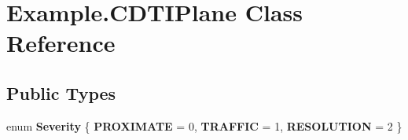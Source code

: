 \hypertarget{class_example_1_1_c_d_t_i_plane}{}\section{Example.\+C\+D\+T\+I\+Plane Class Reference}
\label{class_example_1_1_c_d_t_i_plane}


 


\subsection*{Public Types}
\begin{DoxyCompactItemize}
\item 
\hypertarget{class_example_1_1_c_d_t_i_plane_af140920ed953b8579db5c8021fa03f92}{}enum {\bfseries Severity} \{ {\bfseries P\+R\+O\+X\+I\+M\+A\+T\+E} = 0, 
{\bfseries T\+R\+A\+F\+F\+I\+C} = 1, 
{\bfseries R\+E\+S\+O\+L\+U\+T\+I\+O\+N} = 2
 \}\label{class_example_1_1_c_d_t_i_plane_af140920ed953b8579db5c8021fa03f92}

\end{DoxyCompactItemize}
